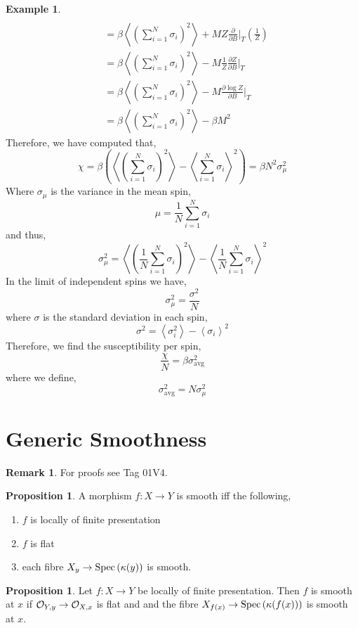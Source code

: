 \documentclass[12pt]{extarticle}
\newcommand{\pderiv}[2]{\frac{\partial{#1}}{\partial{#2}}}
\theoremstyle{definition}
\newtheorem{proposition}[theorem]{Proposition}
\newtheorem{example}[theorem]{Example}
\newtheorem{remark}{Remark}
\begin{document}
\begin{example}
\begin{align*}
\\
& = \beta \left< \left( \sum_{i = 1}^N \sigma_i \right)^2 \right> + M Z \pderiv{}{B} \bigg|_T \left( \frac{1}{Z} \right)
\\
& = \beta \left<  \left( \sum_{i = 1}^N \sigma_i \right)^2 \right> - M \frac{1}{Z} \pderiv{Z}{B} \bigg|_T 
\\
& = \beta \left<  \left( \sum_{i = 1}^N \sigma_i \right)^2 \right> - M \pderiv{\log{Z}}{B} \bigg|_T 
\\
& = \beta \left< \left( \sum_{i = 1}^N \sigma_i \right)^2 \right> - \beta M^2
\end{align*}
Therefore, we have computed that,
\[ \chi = \beta \left( \left< \left( \sum_{i = 1}^N \sigma_i \right)^2 \right> - \left<  \sum_{i = 1}^N \sigma_i \right>^2 \right) = \beta N^2 \sigma^2_{\mu} \]
Where $\sigma_\mu$ is the variance in the mean spin,
\[ \mu =  \frac{1}{N}  \sum_{i = 1}^N \sigma_i \]
and thus,
\[ \sigma_\mu^2 = \left< \left( \frac{1}{N} \sum_{i = 1}^N \sigma_i \right)^2 \right> - \left< \frac{1}{N} \sum_{i = 1}^N \sigma_i  \right>^2 \]
In the limit of independent spins we have,
\[ \sigma_\mu^2 = \frac{\sigma^2}{N} \]
where $\sigma$ is the standard deviation in each spin,
\[ \sigma^2 = \left< \sigma_i^2 \right> - \left< \sigma_i \right>^2 \]
Therefore, we find the susceptibility per spin,
\[ \frac{\chi}{N} = \beta \sigma_{\text{avg}}^2 \]
where we define,
\[ \sigma_{\text{avg}}^2 = N \sigma_\mu^2 \]
\end{example}


\section{Generic Smoothness}

\renewcommand{\A}{\mathbb{A}}

\begin{remark}
For proofs see Tag 01V4.
\end{remark}

\begin{proposition}
A morphism $f : X \to Y$ is smooth iff the following,
\begin{enumerate}
\item $f$ is locally of finite presentation
\item $f$ is flat
\item each fibre $X_y \to \mathrm{Spec}\left(\kappa(y)\right)$ is smooth.
\end{enumerate} 
\end{proposition}

\begin{proposition}
Let $f : X \to Y$ be locally of finite presentation. Then $f$ is smooth at $x$ if $\mathcal{O}_{Y, y} \to \mathcal{O}_{X, x}$ is flat and and the fibre $X_{f(x)} \to \mathrm{Spec}\left(\kappa(f(x))\right)$ is smooth at $x$.  
\end{proposition}
\end{document}
